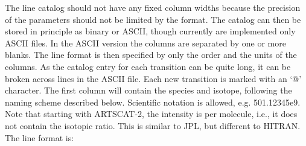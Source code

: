 The line catalog should not have any fixed column widths because the
precision of the parameters should not be limited by the format. The
catalog can then be stored in principle as binary or ASCII, though
currently are implemented only ASCII files. In the ASCII version
the columns are separated by one or more blanks. The line format is
then specified by only the order and the units of the columns. As the
catalog entry for each transition can be quite long, it can be broken
across lines in the ASCII file. Each new transition is marked with an
`@' character.  The first column will contain the species and isotope,
following the naming scheme described below. Scientific notation is
allowed, e.g. 501.12345e9.  Note that starting with ARTSCAT-2, the
intensity is per molecule, i.e., it does not contain the isotopic
ratio. This is similar to JPL, but different to HITRAN.  The line
format is:

